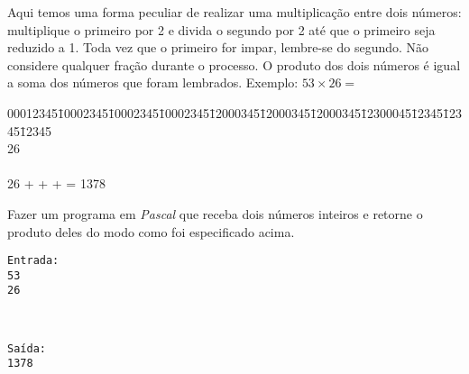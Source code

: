 \item  Aqui temos uma forma peculiar de realizar uma multiplicação entre
dois números: multiplique o primeiro por 2 e divida o segundo por 2
até que o primeiro seja reduzido a 1. Toda vez que o primeiro for
impar, lembre-se do segundo. Não considere qualquer fração durante
o processo. O produto dos dois números é igual a soma dos números
que foram lembrados. Exemplo: $53 \times 26 =$

\begin {tabbing}
00012345\=10002345\=10002345\=10002345\=12000345\=12000345\=12000345\=12300045\=12345\=12345\=12345       \\
26      \\
\\
26 + \>  + \>  +  = 1378
\end {tabbing}

Fazer um programa em \emph{Pascal}
que receba dois números inteiros e retorne o produto deles
do modo como foi especificado acima.

\begin{minipage}{5cm}
\begin{verbatim}
Entrada:
53
26
\end{verbatim}
\end{minipage} \
\begin{minipage}{5cm}
\begin{verbatim}
Saída:
1378
\end{verbatim}
\end{minipage}